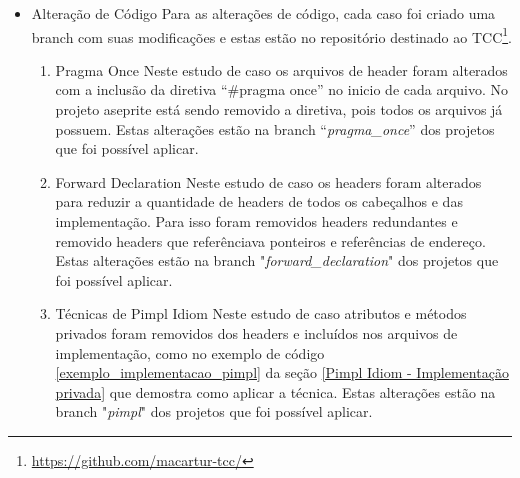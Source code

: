 \begin{itemize}
    \item Alteração de Código
    \subitem
 Para as alterações de código, cada caso foi criado
 uma branch com suas modificações e estas estão no repositório
 destinado ao TCC\footnote{\url{https://github.com/macartur-tcc/}}.
    \begin{enumerate}
        \item Pragma Once
        \subitem Neste estudo de caso os arquivos de header foram alterados
 com a inclusão da diretiva “\#pragma once” no inicio de cada arquivo.
 No projeto aseprite está sendo removido a diretiva, pois todos os arquivos já possuem.
Estas alterações estão na branch “\textit{pragma\_once}” dos projetos que foi possível aplicar.
        \item Forward Declaration
        \subitem Neste estudo de caso os headers foram alterados para reduzir
 a quantidade de headers de todos os cabeçalhos e das implementação.
 Para isso foram removidos headers redundantes e removido headers que referênciava
 ponteiros e referências de endereço.
Estas alterações estão na branch "\textit{forward\_declaration}" dos projetos que foi possível aplicar.
        \item Técnicas de Pimpl Idiom
        \subitem Neste estudo de caso atributos e métodos privados foram removidos dos headers
 e incluídos nos arquivos de implementação, como no exemplo de código \ref{exemplo_implementacao_pimpl}
 da seção \ref{Pimpl Idiom - Implementação privada}
 que demostra como aplicar a técnica.
Estas alterações estão na branch "\textit{pimpl}" dos projetos que foi possível aplicar.
    \end{enumerate}


\end{itemize}
